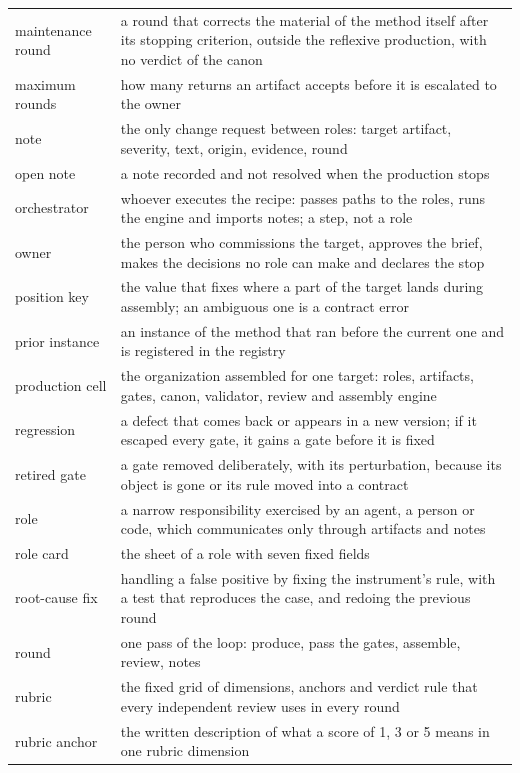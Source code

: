 \documentclass[
  american,
  10pt,
]{report}
\begin{document}
{\begin{longtable}[]{@{}
  >{\raggedright\arraybackslash}p{}
  >{\raggedright\arraybackslash}p{}@{}}
maintenance round & a round that corrects the material of the method
itself after its stopping criterion, outside the reflexive production,
with no verdict of the canon \\
maximum rounds & how many returns an artifact accepts before it is
escalated to the owner \\
note & the only change request between roles: target artifact, severity,
text, origin, evidence, round \\
open note & a note recorded and not resolved when the production
stops \\
orchestrator & whoever executes the recipe: passes paths to the roles,
runs the engine and imports notes; a step, not a role \\
owner & the person who commissions the target, approves the brief, makes
the decisions no role can make and declares the stop \\
position key & the value that fixes where a part of the target lands
during assembly; an ambiguous one is a contract error \\
prior instance & an instance of the method that ran before the current
one and is registered in the registry \\
production cell & the organization assembled for one target: roles,
artifacts, gates, canon, validator, review and assembly engine \\
regression & a defect that comes back or appears in a new version; if it
escaped every gate, it gains a gate before it is fixed \\
retired gate & a gate removed deliberately, with its perturbation,
because its object is gone or its rule moved into a contract \\
role & a narrow responsibility exercised by an agent, a person or code,
which communicates only through artifacts and notes \\
role card & the sheet of a role with seven fixed fields \\
root-cause fix & handling a false positive by fixing the instrument's
rule, with a test that reproduces the case, and redoing the previous
round \\
round & one pass of the loop: produce, pass the gates, assemble, review,
notes \\
rubric & the fixed grid of dimensions, anchors and verdict rule that
every independent review uses in every round \\
rubric anchor & the written description of what a score of 1, 3 or 5
means in one rubric dimension \\

\end{longtable}}
\end{document}

